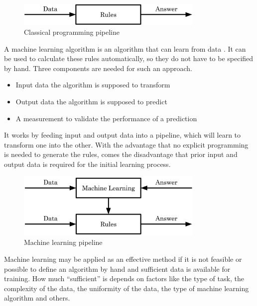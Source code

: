 \begin{figure}[H]
\centering
\par
\includegraphics[width=0.8\textwidth]{imgs/classic_prog.png}
\caption{Classical programming pipeline}
\par
\end{figure}

A machine learning algorithm is an algorithm that can learn from data \cite{Goodfellow2016}. It can be used to calculate these rules automatically, so they do not have to be specified by hand. Three components are needed for such an approach.

\begin{itemize}
\item Input data the algorithm is supposed to transform
\item Output data the algorithm is supposed to predict
\item A measurement to validate the performance of a prediction
\end{itemize}

It works by feeding input and output data into a pipeline, which will learn to transform one into the other. With the advantage that no explicit programming is needed to generate the rules, comes the disadvantage that prior input and output data is required for the initial learning process.

\begin{figure}[H]
\centering
\par
\includegraphics[width=0.8\textwidth]{imgs/ml_pipeline.png}
\caption{Machine learning pipeline}
\par
\end{figure}

Machine learning may be applied as an effective method if it is not feasible or possible to define an algorithm by hand and sufficient data is available for training. How much “sufficient” is depends on factors like the type of task, the complexity of the data, the uniformity of the data, the type of machine learning algorithm and others.

